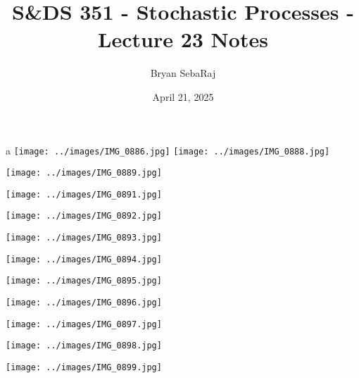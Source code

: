 \documentclass{article}
\title{S\&DS 351 - Stochastic Processes - Lecture 23 Notes}
\author{Bryan SebaRaj}
\date{April 21, 2025}
\begin{document}
\maketitle
a
\texttt{[image: ../images/IMG\_0886.jpg]}
\texttt{[image: ../images/IMG\_0888.jpg]}

\texttt{[image: ../images/IMG\_0889.jpg]}

\texttt{[image: ../images/IMG\_0891.jpg]}

\texttt{[image: ../images/IMG\_0892.jpg]}

\texttt{[image: ../images/IMG\_0893.jpg]}

\texttt{[image: ../images/IMG\_0894.jpg]}

\texttt{[image: ../images/IMG\_0895.jpg]}

\texttt{[image: ../images/IMG\_0896.jpg]}

\texttt{[image: ../images/IMG\_0897.jpg]}

\texttt{[image: ../images/IMG\_0898.jpg]}

\texttt{[image: ../images/IMG\_0899.jpg]}
\end{document}
